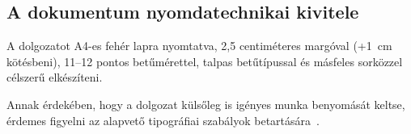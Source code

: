 \subsection{A dokumentum nyomdatechnikai kivitele}
A dolgozatot A4-es fehér lapra nyomtatva, 2,5 centiméteres margóval (+1~cm kötésbeni), 11--12 pontos betűmérettel, talpas betűtípussal és másfeles sorközzel célszerű elkészíteni.

Annak érdekében, hogy a dolgozat külsőleg is igényes munka benyomását keltse, érdemes figyelni az alapvető tipográfiai szabályok betartására~\cite{Jeney}.
